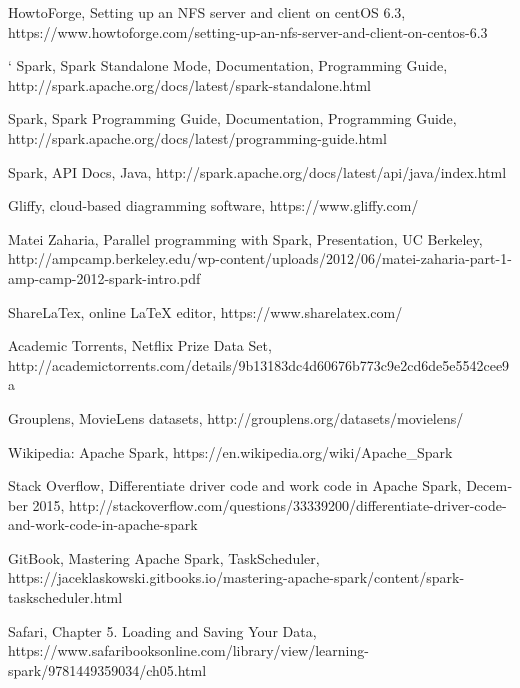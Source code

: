 \documentclass{report}
\begin{document}
{\begin{thebibliography}{9}
\textlatin{HowtoForge, Setting up an NFS server and client on centOS 6.3,
https://www.howtoforge.com/setting-up-an-nfs-server-and-client-on-centos-6.3}


 `
\textlatin{Spark, Spark Standalone Mode,} \textlatin{Documentation, Programming Guide, http://spark.apache.org/docs/latest/spark-standalone.html}

\textlatin{Spark, Spark Programming Guide,} \textlatin{Documentation, Programming Guide, http://spark.apache.org/docs/latest/programming-guide.html}

\textlatin{Spark,} \textlatin{API Docs, Java, http://spark.apache.org/docs/latest/api/java/index.html}

\textlatin{Gliffy,} \textlatin{cloud-based diagramming software, https://www.gliffy.com/}

\textlatin{Matei Zaharia,} \textlatin{Parallel programming with Spark, Presentation, UC Berkeley, http://ampcamp.berkeley.edu/wp-content/uploads/2012/06/matei-zaharia-part-1-amp-camp-2012-spark-intro.pdf}

\textlatin{ShareLaTex,} \textlatin{online LaTeX editor, https://www.sharelatex.com/}

\textlatin{Academic Torrents, Netflix Prize Data Set, \\ http://academictorrents.com/details/9b13183dc4d60676b773c9e2cd6de5e5542cee9a}


\textlatin{Grouplens, MovieLens datasets, http://grouplens.org/datasets/movielens/}



\textlatin{Wikipedia: Apache Spark, https://en.wikipedia.org/wiki/Apache\_Spark}

\textlatin{Stack Overflow, Differentiate driver code and work code in Apache Spark, December 2015, http://stackoverflow.com/questions/33339200/differentiate-driver-code-and-work-code-in-apache-spark}


\textlatin{GitBook, Mastering Apache Spark, TaskScheduler, https://jaceklaskowski.gitbooks.io/mastering-apache-spark/content/spark-taskscheduler.html}

\textlatin{Safari, Chapter 5. Loading and Saving Your Data, https://www.safaribooksonline.com/library/view/learning-spark/9781449359034/ch05.html}


\end{thebibliography}}
\end{document}
